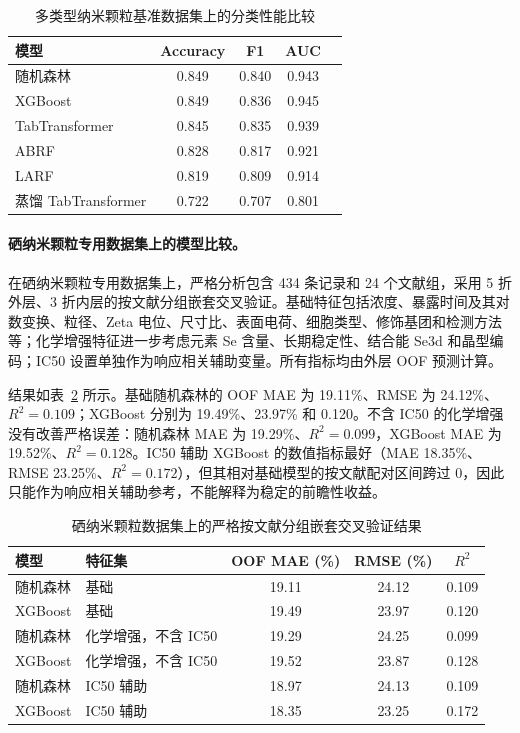 \begin{table}[htbp]
  \centering
  \caption{多类型纳米颗粒基准数据集上的分类性能比较}
  \label{tab:benchmark_classification}
  \begin{tabular}{lcccc}
    \hline
    模型 & Accuracy & F1 & AUC \\
    \hline
    随机森林 & 0.849 & 0.840 & 0.943 \\
    XGBoost & 0.849 & 0.836 & 0.945 \\
    TabTransformer & 0.845 & 0.835 & 0.939 \\
    ABRF & 0.828 & 0.817 & 0.921 \\
    LARF & 0.819 & 0.809 & 0.914 \\
    蒸馏 TabTransformer & 0.722 & 0.707 & 0.801 \\
    \hline
  \end{tabular}
\end{table}

\paragraph{硒纳米颗粒专用数据集上的模型比较。}
在硒纳米颗粒专用数据集上，严格分析包含 434 条记录和 24 个文献组，采用 5 折外层、3 折内层的按文献分组嵌套交叉验证。基础特征包括浓度、暴露时间及其对数变换、粒径、Zeta 电位、尺寸比、表面电荷、细胞类型、修饰基团和检测方法等；化学增强特征进一步考虑元素 Se 含量、长期稳定性、结合能 Se3d 和晶型编码；IC50 设置单独作为响应相关辅助变量。所有指标均由外层 OOF 预测计算。

结果如表~\ref{tab:senp_main_results} 所示。基础随机森林的 OOF MAE 为 19.11\%、RMSE 为 24.12\%、$R^2=0.109$；XGBoost 分别为 19.49\%、23.97\% 和 0.120。不含 IC50 的化学增强没有改善严格误差：随机森林 MAE 为 19.29\%、$R^2=0.099$，XGBoost MAE 为 19.52\%、$R^2=0.128$。IC50 辅助 XGBoost 的数值指标最好（MAE 18.35\%、RMSE 23.25\%、$R^2=0.172$），但其相对基础模型的按文献配对区间跨过 0，因此只能作为响应相关辅助参考，不能解释为稳定的前瞻性收益。

\begin{table}[htbp]
  \centering
  \caption{硒纳米颗粒数据集上的严格按文献分组嵌套交叉验证结果}
  \label{tab:senp_main_results}
  \begin{tabular}{llccc}
    \hline
    模型 & 特征集 & OOF MAE (\%) & RMSE (\%) & $R^2$ \\
    \hline
    随机森林 & 基础 & 19.11 & 24.12 & 0.109 \\
    XGBoost & 基础 & 19.49 & 23.97 & 0.120 \\
    随机森林 & 化学增强，不含 IC50 & 19.29 & 24.25 & 0.099 \\
    XGBoost & 化学增强，不含 IC50 & 19.52 & 23.87 & 0.128 \\
    随机森林 & IC50 辅助 & 18.97 & 24.13 & 0.109 \\
    XGBoost & IC50 辅助 & 18.35 & 23.25 & 0.172 \\
    \hline
  \end{tabular}
\end{table}

